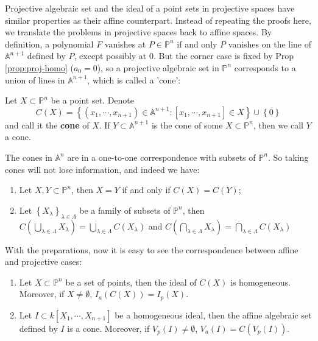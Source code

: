 \documentclass{note-eng}
\begin{document}
Projective algebraic set and the ideal of a point sets in projective spaces have similar properties as their affine counterpart. Instead of repeating the proofs here, we translate the problems in projective spaces back to affine spaces. By definition, a polynomial $F$ vanishes at $P \in \mathbb{P}^n$ if and only $P$ vanishes on the line of $\mathbb{A}^{n + 1}$ defined by $P$, except possibly at $0$. But the corner case is fixed by Prop \ref{prop:proj-homo} ($a_0 = 0$), so a projective algebraic set in $\mathbb{P}^n$ corresponds to a union of lines in $\mathbb{A}^{n + 1}$, which is called a 'cone':

\begin{definition}[Cone]
    Let $X \subset \mathbb{P}^n$ be a point set. Denote
    $$C(X) = \left\lbrace (x_1, \cdots, x_{n + 1}) \in \mathbb{A}^{n + 1}: [x_1, \cdots, x_{n + 1}] \in X \right\rbrace \cup \left\lbrace 0 \right\rbrace$$
    and call it the \textbf{cone} of $X$. If $Y \subset \mathbb{A}^{n + 1}$ is the cone of some $X \subset \mathbb{P}^n$, then we call $Y$ a cone.
\end{definition}

The cones in $\mathbb{A}^n$ are in a one-to-one correspondence with subsets of $\mathbb{P}^n$. So taking cones will not lose information, and indeed we have:
    
\begin{proposition} \label{prop:cone-correspondence}
    \begin{enumerate}
        \item Let $X, Y \subset \mathbb{P}^n$, then $X = Y$ if and only if $C(X) = C(Y)$;
        \item Let $\left\lbrace X_\lambda \right\rbrace_{\lambda \in \Lambda}$ be a family of subsets of $\mathbb{P}^n$, then $C\left(\bigcup\limits_{\lambda \in \Lambda} X_\lambda\right) = \bigcup\limits_{\lambda \in \Lambda} C(X_\lambda)$ and $C\left(\bigcap\limits_{\lambda \in \Lambda} X_\lambda\right) = \bigcap\limits_{\lambda \in \Lambda} C(X_\lambda)$
    \end{enumerate}
\end{proposition}

With the preparations, now it is easy to see the correspondence between affine and projective cases:

\begin{proposition}\label{prop:translate-affine}
    \begin{enumerate}
        \item Let $X \subset \mathbb{P}^n$ be a set of points, then the ideal of $C(X)$ is homogeneous. Moreover, if $X \ne \emptyset$, $I_a(C(X)) = I_p(X)$.
        \item Let $I \subset k[X_1, \cdots, X_{n + 1}]$ be a homogeneous ideal, then the affine algebraic set defined by $I$ is a cone. Moreover, if $V_p(I) \ne \emptyset$, $V_a(I) = C(V_p(I))$.
    \end{enumerate}
\end{proposition}
\end{document}
